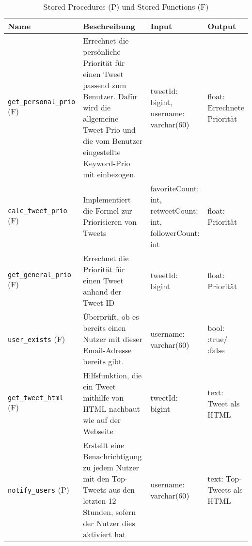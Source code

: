 \begin{table}[!ht]
\small 
\caption{Stored-Procedures (P) und Stored-Functions (F)}
  \begin{tabular}{p{3.3cm}p{5.4cm}p{3.2cm}p{1.8cm}}
    \toprule 
    \textbf{Name} & \textbf{Beschreibung} & \textbf{Input} & \textbf{Output} \\
    \hline
    \texttt{get\_personal\_prio} (F) & Errechnet die persönliche Priorität für einen Tweet passend zum Benutzer. Dafür wird die allgemeine Tweet-Prio und die vom Benutzer eingestellte Keyword-Prio mit einbezogen. & tweetId: bigint, \newline username: \newline varchar(60) & float: \newline Errechnete Priorität \\
    \texttt{calc\_tweet\_prio} (F) & Implementiert die Formel zur Priorisieren von Tweets & favoriteCount: int, \newline retweetCount: int, followerCount: int & float: \newline Priorität \\
    \texttt{get\_general\_prio} (F) & Errechnet die Priorität für einen Tweet anhand der Tweet-ID & tweetId: bigint  & float: \newline Priorität \\
     \texttt{user\_exists} (F) & Überprüft, ob es bereits einen Nutzer mit dieser Email-Adresse bereits gibt.  & username: \newline varchar(60) & bool: \newline 1:true/ \newline 0:false \\
 	 \texttt{get\_tweet\_html} (F) & Hilfsfunktion, die ein Tweet mithilfe von HTML nachbaut wie auf der Webseite & tweetId: bigint & text: \newline Tweet \newline als HTML \\
 	 \texttt{notify\_users} (P) & Erstellt eine Benachrichtigung zu jedem Nutzer mit den Top-Tweets aus den letzten 12 Stunden, sofern der Nutzer dies aktiviert hat & username: \newline varchar(60) & text: \newline Top-Tweets als HTML \\

\end{tabular}
\end{table}
